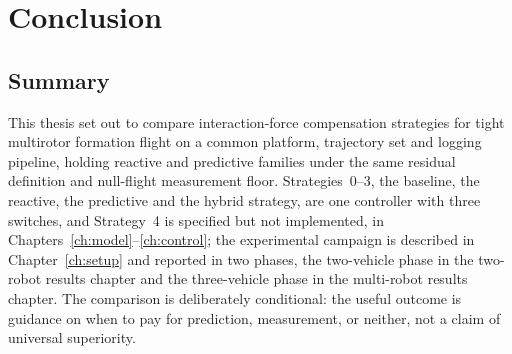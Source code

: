 %
%
%

\chapter{Conclusion}
\label{ch:conclusion}

\section{Summary}
\label{sec:conclusion-summary}

This thesis set out to compare interaction-force compensation strategies for tight multirotor
formation flight on a common platform, trajectory set and logging pipeline, holding reactive and
predictive families under the same residual definition and null-flight measurement floor.
Strategies~0--3, the baseline, the reactive, the predictive and the hybrid strategy, are one
controller with three switches, and Strategy~4 is specified but not implemented, in
Chapters~\ref{ch:model}--\ref{ch:control}; the experimental
campaign is described in Chapter~\ref{ch:setup} and reported in two phases, the two-vehicle phase in
the two-robot results chapter and the three-vehicle phase in the multi-robot results chapter.
The comparison is deliberately conditional: the useful outcome is guidance
on when to pay for prediction, measurement, or neither, not a claim of universal superiority.

